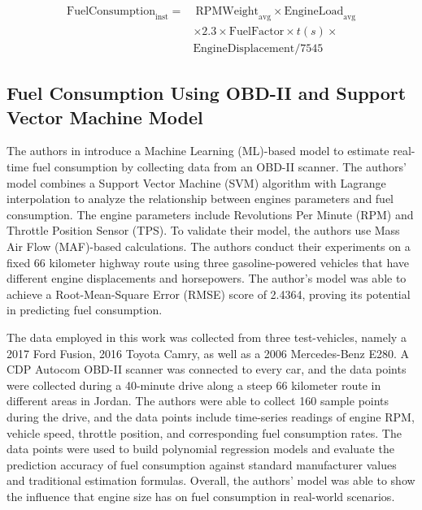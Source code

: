 \documentclass[letterpaper]{article}
\begin{document}
\[
\begin{aligned}
    \mathrm{FuelConsumption}_{\mathrm{inst}} =&~ \mathrm{RPMWeight}_{\mathrm{avg}}
    \times \mathrm{EngineLoad}_{\mathrm{avg}}\\
    &\times 2.3 \times \mathrm{FuelFactor}
    \times t(s)\times\\ 
    &\mathrm{EngineDisplacement}/7545  
\end{aligned}
\] 

\noindent


\subsection*{Fuel Consumption Using OBD-II and Support Vector Machine Model}

The authors in \cite{abukhalil2020fuel} introduce a Machine Learning (ML)-based
model to estimate real-time fuel consumption by collecting data from an OBD-II
scanner. The authors’ model combines a Support Vector Machine (SVM) algorithm
with Lagrange interpolation to analyze the relationship between engines
parameters and fuel consumption. The engine parameters include Revolutions Per
Minute (RPM) and Throttle Position Sensor (TPS). To validate their model, the
authors use Mass Air Flow (MAF)-based calculations. The authors conduct their
experiments on a fixed 66 kilometer highway route using three gasoline-powered
vehicles that have different engine displacements and horsepowers. The author’s
model was able to achieve a Root-Mean-Square Error (RMSE) score of 2.4364,
proving its potential in predicting fuel consumption. 

The data employed in this
work was collected from three test-vehicles, namely a 2017 Ford Fusion, 2016
Toyota Camry, as well as a 2006 Mercedes-Benz E280. A CDP Autocom OBD-II scanner
was connected to every car, and the data points were collected during a
40-minute drive along a steep 66 kilometer route in different areas in Jordan.
The authors were able to collect 160 sample points during the drive, and the
data points include time-series readings of engine RPM, vehicle speed, throttle
position, and corresponding fuel consumption rates. The data points were used to
build polynomial regression models and evaluate the prediction accuracy of fuel
consumption against standard manufacturer values and traditional estimation
formulas. Overall, the authors' model was able to show the influence that engine
size has on fuel consumption in real-world scenarios.
\end{document}
